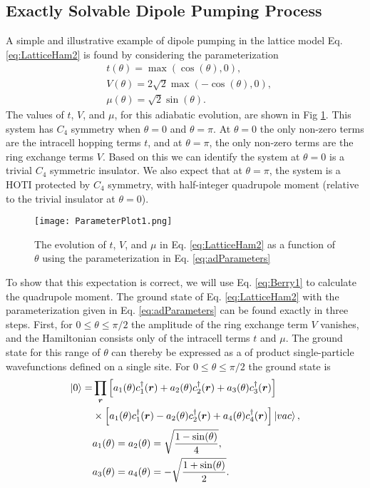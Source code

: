 \documentclass[prb,aps,twocolumn,groupaddress,floatfix]{revtex4-1}
\begin{document}
\subsection{Exactly Solvable Dipole Pumping Process}\label{ssec:ExactSolvablePump}
A simple and illustrative example of dipole pumping in the lattice model Eq. \ref{eq:LatticeHam2} is found by considering the parameterization
\begin{equation}
\begin{split}
& t(\theta ) = \max(\cos(\theta ),0),\\
&V(\theta ) = 2\sqrt{2}\max(-\cos(\theta ),0),\\
&\mu(\theta ) = \sqrt{2}\sin(\theta ).
\end{split}
\label{eq:adParameters}
\end{equation}  The values of $t$, $V$, and $\mu$, for this adiabatic evolution, are shown in Fig \ref{fig:parameterplot1}. This system has $C_4$ symmetry when $\theta = 0$ and $\theta = \pi$. At $\theta  = 0$ the only non-zero terms are the intracell hopping terms $t$, and at $\theta = \pi$, the only non-zero terms are the ring exchange terms $V$. Based on this we can identify the system at $\theta = 0$ is a trivial $C_4$ symmetric insulator. We also expect that at $\theta = \pi$, the system is a HOTI protected by $C_4$ symmetry, with half-integer quadrupole moment (relative to the trivial insulator at $\theta = 0$). 

\begin{figure}
\texttt{[image: ParameterPlot1.png]}
\caption{The evolution of $t$, $V$, and $\mu$ in Eq. \ref{eq:LatticeHam2} as a function of $\theta$ using the parameterization in Eq. \ref{eq:adParameters}}\label{fig:parameterplot1}
\end{figure}

To show that this expectation is correct, we will use Eq. \ref{eq:Berry1} to calculate the quadrupole moment. The ground state of Eq. \ref{eq:LatticeHam2} with the parameterization given in Eq. \ref{eq:adParameters} can be found exactly in three steps. First, for $0 \leq \theta \leq \pi/2$ the amplitude of the ring exchange term $V$ vanishes, and the Hamiltonian consists only of the intracell terms $t$ and $\mu$. The ground state for this range of $\theta$ can thereby be expressed as a of product single-particle wavefunctions defined on a single site. For $0 \leq \theta \leq \pi/2$ the ground state is
\begin{equation}
\begin{split}
\ket{0} = &\prod_{\bm{r}} \Big[a_1(\theta)c^\dagger_1(\bm{r}) + a_2(\theta)c^\dagger_2(\bm{r})+a_3(\theta)c^\dagger_3(\bm{r})\Big]\\ &\times \Big[a_1(\theta)c^\dagger_1(\bm{r}) - a_2(\theta)c^\dagger_2(\bm{r})+a_4(\theta)c^\dagger_4(\bm{r})\Big] \ket{vac},\\
&a_1(\theta) =a_2(\theta)= \sqrt{\frac{1-\sin(\theta)}{4}}, \\
&a_3(\theta) =a_4(\theta) = -\sqrt{\frac{1+\sin(\theta)}{2}}. 
\end{split}\label{eq:exactGS1}
\end{equation}
\end{document}
